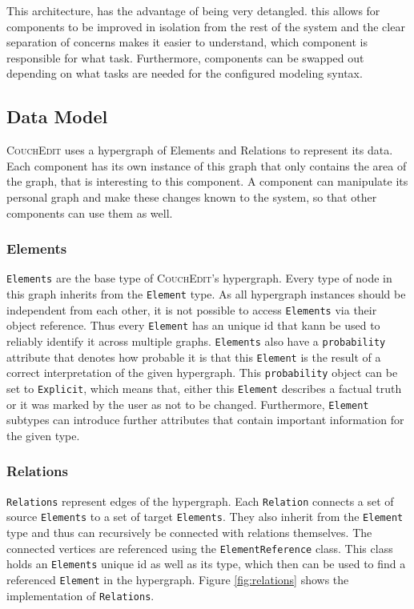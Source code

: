 This architecture, has the advantage of being very detangled. this allows for components to be improved in isolation from the rest of the system and the clear separation of concerns makes it easier to understand, which component is responsible for what task. Furthermore, components can be swapped out depending on what tasks are needed for the configured modeling syntax.



\subsection{Data Model}
\textsc{CouchEdit} uses a hypergraph of Elements and Relations to represent its data. Each component has its own instance of this graph that only contains the area of the graph, that is interesting to this component. A component can manipulate its personal graph and make these changes known to the system, so that other components can use them as well.


\subsubsection{Elements}
\texttt{Elements} are the base type of \textsc{CouchEdit}'s hypergraph. Every type of node in this graph inherits from the \texttt{Element} type. As all hypergraph instances should be independent from each other, it is not possible to access \texttt{Elements} via their object reference. Thus every \texttt{Element} has an unique id that kann be used to reliably identify it across multiple graphs. \texttt{Elements} also have a \texttt{probability} attribute that denotes how probable it is that this \texttt{Element} is the result of a correct interpretation of the given hypergraph. This \texttt{probability} object can be set to \texttt{Explicit}, which means that, either this \texttt{Element} describes a factual truth or it was marked by the user as not to be changed. Furthermore, \texttt{Element} subtypes can introduce further attributes that contain important information for the given type.

\subsubsection{Relations}
\texttt{Relations} represent edges of the hypergraph. Each \texttt{Relation} connects a set of source \texttt{Elements} to a set of target \texttt{Elements}. They also inherit from the \texttt{Element} type and thus can recursively be connected with relations themselves. The connected vertices are referenced using the \texttt{ElementReference} class. This class holds an \texttt{Elements} unique id as well as its type, which then can be used to find a referenced \texttt{Element} in the hypergraph. Figure \ref{fig:relations} shows the implementation of \texttt{Relations}. 

